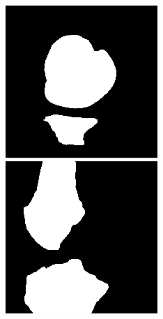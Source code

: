 \begin{figure}[H]
\endminipage
\vspace{0.15cm}
  \includegraphics[width=\linewidth]{imgs/transfer_pers_y1.png}
\endminipage\hfill
{}
  \includegraphics[width=\linewidth]{imgs/transfer_pers_y2.png}

\end{figure}
